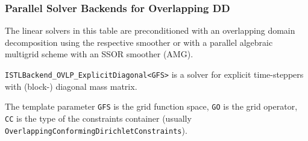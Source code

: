 \documentclass[aspectratio=169,11pt]{beamer}
\theoremstyle{definition}
\begin{document}
\begin{frame}
  \frametitle{Parallel Solver Backends for Overlapping DD}
The linear solvers in this table are preconditioned with an overlapping domain decomposition
using the respective smoother or with a parallel algebraic multigrid scheme with an SSOR smoother (AMG).\medskip

\medskip

\lstinline!ISTLBackend_OVLP_ExplicitDiagonal<GFS>! is a solver for explicit
time-steppers with (block-) diagonal mass matrix.

The template parameter \lstinline!GFS! is the grid function space, \lstinline!GO! is the grid operator, \lstinline!CC! is the type of the
constraints container (usually \lstinline!OverlappingConformingDirichletConstraints!).
\end{frame}
\end{document}

